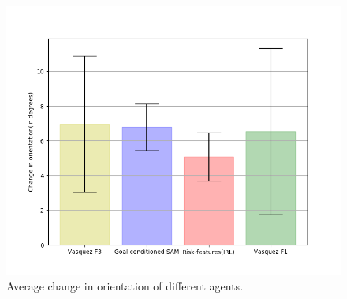 \begin{figure}[htbp]
	\centering
	\includegraphics[width=0.7\linewidth]{plots/plot_without_outliers/ucy_inter_irl_no_outliers/compute_trajectory_smoothness_ucy_no_outliers_traj_0.png}
	\caption{Average change in orientation of different agents.}
	\label{fig:inter_IRL-change_in_orientation_avg}
\end{figure}


